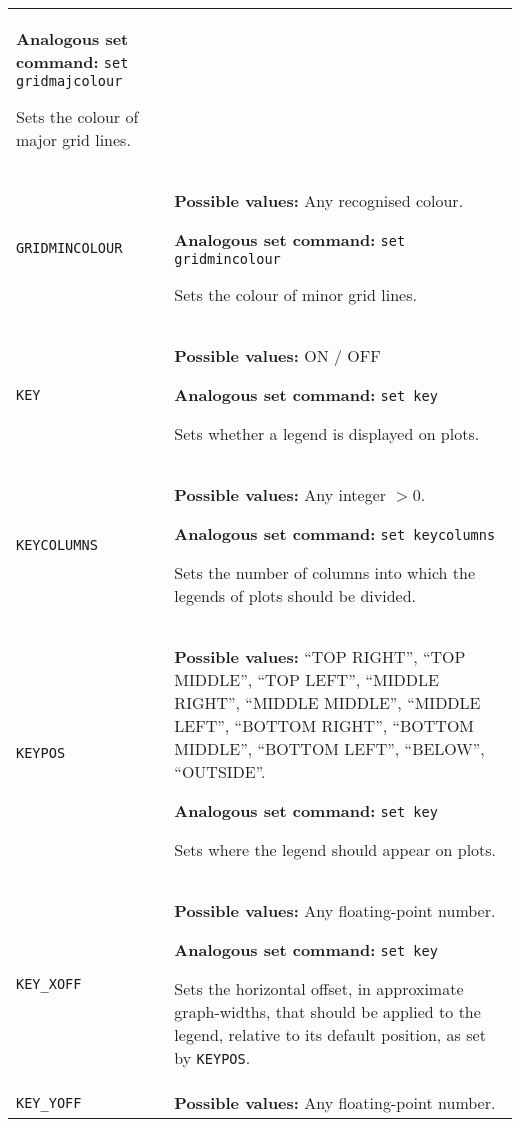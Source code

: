 \documentclass[a4paper,onecolumn,11pt]{book}
\begin{document}
\begin{longtable}{p{3.4cm}p{9cm}}
                   \textbf{Analogous set command:} \texttt{set gridmajcolour}\index{set gridmajcolour command@\texttt{set gridmajcolour} command}

                   Sets the colour of major grid lines.
                   \\
\texttt{GRIDMINCOLOUR} & \textbf{Possible values:} Any recognised colour.

                   \textbf{Analogous set command:} \texttt{set gridmincolour}\index{set gridmincolour command@\texttt{set gridmincolour} command}

                   Sets the colour of minor grid lines.
                   \\
\texttt{KEY} & \textbf{Possible values:} ON / OFF

                   \textbf{Analogous set command:} \texttt{set key}\index{set key command@\texttt{set key} command}

                   Sets whether a legend is displayed on plots.
                   \\
\texttt{KEYCOLUMNS} & \textbf{Possible values:} Any integer $>0$.

                   \textbf{Analogous set command:} \texttt{set keycolumns}\index{set keycolumnscommand@\texttt{set keycolumns} command}

                   Sets the number of columns into which the legends of plots should be divided.
                   \\
\texttt{KEYPOS} & \textbf{Possible values:} ``TOP RIGHT'', ``TOP MIDDLE'', ``TOP LEFT'', ``MIDDLE RIGHT'', ``MIDDLE MIDDLE'', ``MIDDLE LEFT'', ``BOTTOM RIGHT'', ``BOTTOM MIDDLE'', ``BOTTOM LEFT'', ``BELOW'', ``OUTSIDE''.

                   \textbf{Analogous set command:} \texttt{set key}\index{set key command@\texttt{set key} command}

                   Sets where the legend should appear on plots.
                   \\
\texttt{KEY\_XOFF} & \textbf{Possible values:} Any floating-point number.

                   \textbf{Analogous set command:} \texttt{set key}\index{set key command@\texttt{set key} command}

                   Sets the horizontal offset, in approximate graph-widths, that should be applied to the legend, relative to its default position, as set by \texttt{KEYPOS}.
                   \\
\texttt{KEY\_YOFF} & \textbf{Possible values:} Any floating-point number.


\end{longtable}
\end{document}
